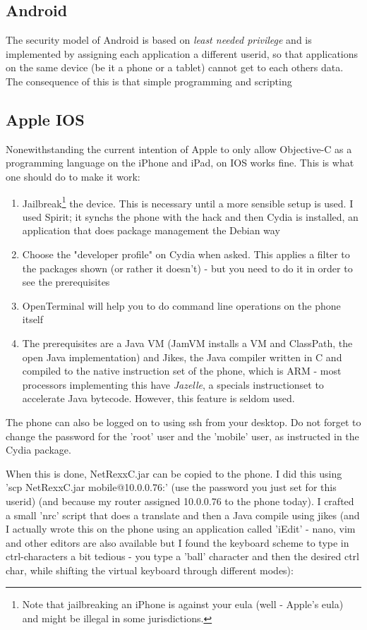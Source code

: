 \subsection{Android}
The security model of Android is based on \emph{least needed
  privilege} and is implemented by assigning each application a
different userid, so that applications on the same device (be it a
phone or a tablet) cannot get to each others data. The consequence of
this is that simple \nr{} programming and scripting 
\subsection{Apple IOS}
Nonewithstanding the current intention of Apple to only allow Objective-C
as a programming language on the iPhone and iPad, \nr{} on IOS works fine. This is what one should do to make it work:
\begin{enumerate}
\item Jailbreak\footnote{Note that jailbreaking an iPhone is against your eula (well - Apple's eula) and might be illegal in some jurisdictions.} the device. This is necessary until a more sensible setup is used. I used Spirit; it synchs the phone with the hack and then Cydia is installed, an application that does package management the Debian way
\item Choose the "developer profile" on Cydia when asked. This applies a filter to the packages shown (or rather it doesn't) - but you need to do it in order to see the prerequisites
\item OpenTerminal will help you to do command line operations on the phone itself
\item The prerequisites are a Java VM (JamVM installs a VM and
  ClassPath, the open Java implementation) and Jikes, the Java
  compiler written in C and compiled to the native instruction set of
  the phone, which is ARM - most processors implementing this have
  \emph{Jazelle}, a specials instructionset to accelerate Java
  bytecode. However, this feature is seldom used. 
\end{enumerate}
The phone can also be logged on to using ssh from your desktop. Do not forget to change the password for the 'root' user and the 'mobile' user, as instructed in the Cydia package.

When this is done, NetRexxC.jar can be copied to the phone. I did this using 'scp NetRexxC.jar mobile@10.0.0.76:' (use the password you just set for this userid) (and because my router assigned 10.0.0.76 to the phone today). I crafted a small 'nrc' script that does a translate and then a Java compile using jikes (and I actually wrote this on the phone using an application called 'iEdit' - nano, vim and other editors are also available but I found the keyboard scheme to type in ctrl-characters a bit tedious - you type a 'ball' character and then the desired ctrl char, while shifting the virtual keyboard through different modes):

